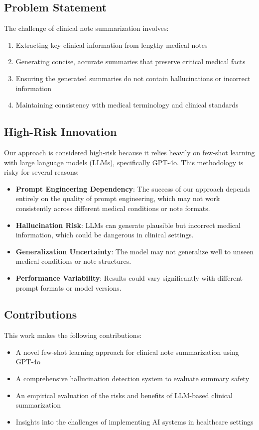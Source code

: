 \documentclass[sigconf]{acmart}
\begin{document}
\subsection{Problem Statement}

The challenge of clinical note summarization involves:
\begin{enumerate}
    \item Extracting key clinical information from lengthy medical notes
    \item Generating concise, accurate summaries that preserve critical medical facts
    \item Ensuring the generated summaries do not contain hallucinations or incorrect information
    \item Maintaining consistency with medical terminology and clinical standards
\end{enumerate}

\subsection{High-Risk Innovation}

Our approach is considered high-risk because it relies heavily on few-shot learning with large language models (LLMs), specifically GPT-4o. This methodology is risky for several reasons:

\begin{itemize}
    \item \textbf{Prompt Engineering Dependency}: The success of our approach depends entirely on the quality of prompt engineering, which may not work consistently across different medical conditions or note formats.
    \item \textbf{Hallucination Risk}: LLMs can generate plausible but incorrect medical information, which could be dangerous in clinical settings.
    \item \textbf{Generalization Uncertainty}: The model may not generalize well to unseen medical conditions or note structures.
    \item \textbf{Performance Variability}: Results could vary significantly with different prompt formats or model versions.
\end{itemize}

\subsection{Contributions}

This work makes the following contributions:
\begin{itemize}
    \item A novel few-shot learning approach for clinical note summarization using GPT-4o
    \item A comprehensive hallucination detection system to evaluate summary safety
    \item An empirical evaluation of the risks and benefits of LLM-based clinical summarization
    \item Insights into the challenges of implementing AI systems in healthcare settings
\end{itemize}
\end{document}
